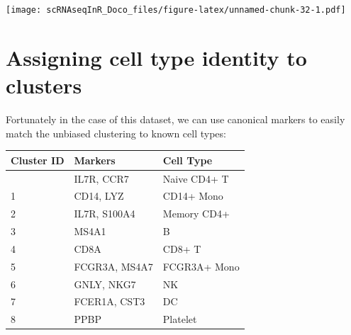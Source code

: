 \documentclass[
]{book}
\newenvironment{Shaded}{\begin{snugshade}}{\end{snugshade}}
\newcommand{\AttributeTok}[1]{\textcolor[rgb]{0.13,0.29,0.53}{#1}}
\newcommand{\ConstantTok}[1]{\textcolor[rgb]{0.56,0.35,0.01}{#1}}
\newcommand{\FloatTok}[1]{\textcolor[rgb]{0.00,0.00,0.81}{#1}}
\newcommand{\FunctionTok}[1]{\textcolor[rgb]{0.13,0.29,0.53}{\textbf{#1}}}
\newcommand{\NormalTok}[1]{#1}
\newcommand{\OtherTok}[1]{\textcolor[rgb]{0.56,0.35,0.01}{#1}}
\newcommand{\SpecialCharTok}[1]{\textcolor[rgb]{0.81,0.36,0.00}{\textbf{#1}}}
\newcommand{\StringTok}[1]{\textcolor[rgb]{0.31,0.60,0.02}{#1}}
\begin{document}
\texttt{[image: scRNAseqInR\_Doco\_files/figure-latex/unnamed-chunk-32-1.pdf]}

\hypertarget{assigning-cell-type-identity-to-clusters}{%
\section{Assigning cell type identity to clusters}\label{assigning-cell-type-identity-to-clusters}}

Fortunately in the case of this dataset, we can use canonical markers to easily match the unbiased clustering to known cell types:

\begin{longtable}[]{@{}lll@{}}
\toprule\noalign{}
Cluster ID & Markers & Cell Type \\
\midrule\noalign{}
\endhead
\bottomrule\noalign{}
\endlastfoot
0 & IL7R, CCR7 & Naive CD4+ T \\
1 & CD14, LYZ & CD14+ Mono \\
2 & IL7R, S100A4 & Memory CD4+ \\
3 & MS4A1 & B \\
4 & CD8A & CD8+ T \\
5 & FCGR3A, MS4A7 & FCGR3A+ Mono \\
6 & GNLY, NKG7 & NK \\
7 & FCER1A, CST3 & DC \\
8 & PPBP & Platelet \\
\end{longtable}

\begin{Shaded}
\end{Shaded}
\end{document}
